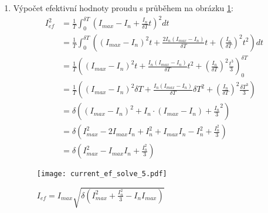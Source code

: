 {\begin{enumerate}
      \item Výpočet efektivní hodnoty proudu s průběhem na obrázku \ref{es:fig_current_ef_solve_5}:
         {\footnotesize
          \begin{align*}
            I_{ef}^2 
              &=  \frac{1}{T}\int_0^{\delta T}\left(I_{max}-I_n + 
                  \frac{I_n}{\delta T}t\right)^2dt                                 \\                   
              &=  \frac{1}{T}\int_0^{\delta T}\left((I_{max}-I_n)^2t + 
                  \frac{2I_n(I_{max}-I_n)}{\delta T}t +
                 (\frac{I_n}{\delta T})^2t^2\right)dt                              \\ 
              &=  \frac{1}{T}\left((I_{max}-I_n)^2t +
                  \frac{I_n(I_{max}-I_n)}{\delta T}t^2 +
                 (\frac{I_n}{\delta T})^2\frac{t^3}{3}\right)_0^{\delta T}         \\ 
              &=  \frac{1}{T}\left((I_{max}-I_n)^2\delta T +
                  \frac{I_n(I_{max}-I_n)}{\delta T}\delta T^2 + 
                 (\frac{I_n}{\delta T})^2\frac{\delta T^3}{3}\right)               \\  
              &=  \delta\left((I_{max} - I_n)^2 + I_n\cdot(I_{max}-I_n) +
                  \frac{I_n}{3}^2\right)                                           \\  
              &=  \delta\left(I_{max}^2-2I_{max}I_n+I_{n}^2 + I_{max}I_n-I_n^2 +
                  \frac{I_n^2}{3} \right)                                          \\ 
              &=  \delta\left(I_{max}^2-I_{max}I_n+\frac{I_n^2}{3}\right)
          \end{align*}
          } %
        \begin{figure}[ht!]
          \centering
          \texttt{[image: current\_ef\_solve\_5.pdf]}
          \caption{\(I_{ef}=I_{max}\sqrt{\delta\left(I_{max}^2+\frac{I_n^2}{3}- 
                   I_nI_{max}\right)}\) }
          \label{es:fig_current_ef_solve_5}
        \end{figure}        
         

\end{enumerate}}

